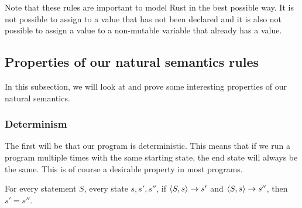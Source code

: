 Note that these rules are important to model Rust in the best possible way. It is not possible to assign to a value that has not been declared and it is also not possible to assign a value to a non-mutable variable that already has a value. 

\subsection{Properties of our natural semantics rules}
In this subsection, we will look at and prove some interesting properties of our natural semantics. 

\subsubsection*{Determinism}

The first will be that our program is deterministic. This means that if we run a program multiple times with the same starting state, the end state will always be the same. This is of course a desirable property in most programs.

\begin{theorem}
For every statement $S$, every state $s, s', s''$, if $\langle S, s \rangle \to s'$ and $\langle S, s \rangle \to s''$, then $s' = s''$.
\end{theorem}

